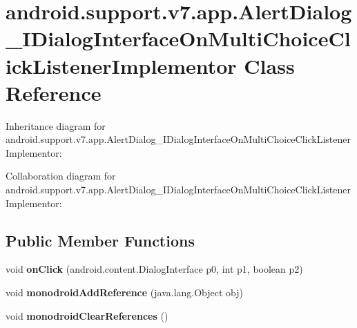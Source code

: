 \hypertarget{classandroid_1_1support_1_1v7_1_1app_1_1_alert_dialog___i_dialog_interface_on_multi_choice_click_listener_implementor}{}\section{android.\+support.\+v7.\+app.\+Alert\+Dialog\+\_\+\+I\+Dialog\+Interface\+On\+Multi\+Choice\+Click\+Listener\+Implementor Class Reference}
\label{classandroid_1_1support_1_1v7_1_1app_1_1_alert_dialog___i_dialog_interface_on_multi_choice_click_listener_implementor}


Inheritance diagram for android.\+support.\+v7.\+app.\+Alert\+Dialog\+\_\+\+I\+Dialog\+Interface\+On\+Multi\+Choice\+Click\+Listener\+Implementor\+:


Collaboration diagram for android.\+support.\+v7.\+app.\+Alert\+Dialog\+\_\+\+I\+Dialog\+Interface\+On\+Multi\+Choice\+Click\+Listener\+Implementor\+:
\subsection*{Public Member Functions}
\begin{DoxyCompactItemize}
\item 
\mbox{\label{classandroid_1_1support_1_1v7_1_1app_1_1_alert_dialog___i_dialog_interface_on_multi_choice_click_listener_implementor_ab3df2296a04acdaf14f8fefa6337673a}} 
void {\bfseries on\+Click} (android.\+content.\+Dialog\+Interface p0, int p1, boolean p2)
\item 
\mbox{\label{classandroid_1_1support_1_1v7_1_1app_1_1_alert_dialog___i_dialog_interface_on_multi_choice_click_listener_implementor_a10372956d10db45bbfdf89738de727e5}} 
void {\bfseries monodroid\+Add\+Reference} (java.\+lang.\+Object obj)
\item 
\mbox{\label{classandroid_1_1support_1_1v7_1_1app_1_1_alert_dialog___i_dialog_interface_on_multi_choice_click_listener_implementor_a8539ec288dc17a276d633f50b2d41e76}} 
void {\bfseries monodroid\+Clear\+References} ()
\end{DoxyCompactItemize}
